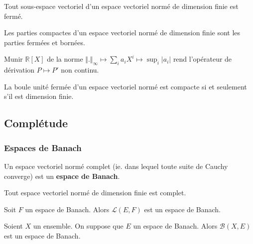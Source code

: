   \begin{corollary}
    Tout sous-espace vectoriel d'un espace vectoriel normé de dimension finie est fermé.
  \end{corollary}

  \begin{corollary}
    Les parties compactes d'un espace vectoriel normé de dimension finie sont les parties fermées et bornées.
  \end{corollary}

  \begin{cexample}
    Munir $\mathbb{R}[X]$ de la norme $\Vert . \Vert_\infty \mapsto \sum_{i} a_i X^i \mapsto \sup_i \vert a_i \vert$ rend l'opérateur de dérivation $P \mapsto P'$ non continu.
  \end{cexample}


  \begin{theorem}[Riesz]
    La boule unité fermée d'un espace vectoriel normé est compacte si et seulement s'il est dimension finie.
  \end{theorem}

  \subsection{Complétude}

  \subsubsection{Espaces de Banach}


  \begin{definition}
    Un espace vectoriel normé complet (ie. dans lequel toute suite de Cauchy converge) est un \textbf{espace de Banach}.
  \end{definition}


  \begin{example}
    Tout espace vectoriel normé de dimension finie est complet.
  \end{example}

  \begin{example}
    Soit $F$ un espace de Banach. Alors $\mathcal{L}(E,F)$ est un espace de Banach.
  \end{example}


  \begin{example}
    Soient $X$ un ensemble. On suppose que $E$ un espace de Banach. Alors $\mathcal{B}(X,E)$ est un espace de Banach.
  \end{example}

